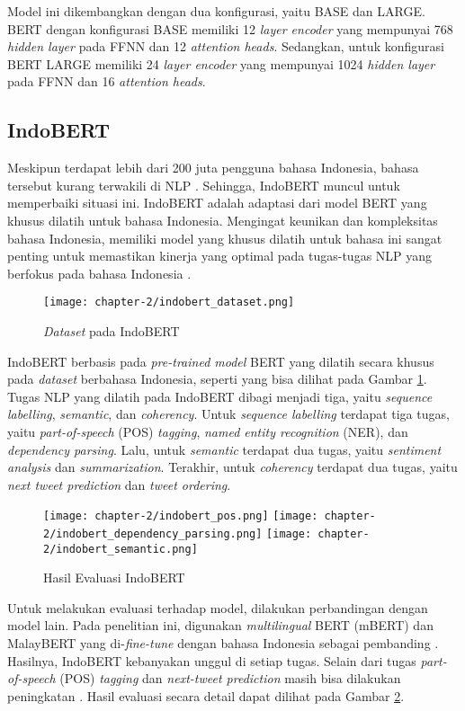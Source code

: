Model ini dikembangkan dengan dua konfigurasi, yaitu BASE dan LARGE. BERT dengan konfigurasi BASE memiliki 12 \textit{layer encoder} yang mempunyai 768 \textit{hidden layer} pada FFNN dan 12 \textit{attention heads}. Sedangkan, untuk konfigurasi BERT LARGE memiliki 24 \textit{layer encoder} yang mempunyai 1024 \textit{hidden layer} pada FFNN dan 16 \textit{attention heads}.

\subsection{IndoBERT}
\label{sec:indobet}

Meskipun terdapat lebih dari 200 juta pengguna bahasa Indonesia, bahasa tersebut kurang terwakili di NLP \parencite{indolem}. Sehingga, IndoBERT muncul untuk memperbaiki situasi ini. IndoBERT adalah adaptasi dari model BERT yang khusus dilatih untuk bahasa Indonesia. Mengingat keunikan dan kompleksitas bahasa Indonesia, memiliki model yang khusus dilatih untuk bahasa ini sangat penting untuk memastikan kinerja yang optimal pada tugas-tugas NLP yang berfokus pada bahasa Indonesia \parencite{indolem}.

\begin{figure}[ht]
    \centering
    \texttt{[image: chapter-2/indobert\_dataset.png]}
    \caption{\textit{Dataset} pada IndoBERT \parencite{indolem}}
    \label{fig:indobert_dataset}
\end{figure}

IndoBERT berbasis pada \textit{pre-trained model} BERT yang dilatih secara khusus pada \textit{dataset} berbahasa Indonesia, seperti yang bisa dilihat pada Gambar \ref{fig:indobert_dataset}. Tugas NLP yang dilatih pada IndoBERT dibagi menjadi tiga, yaitu \textit{sequence labelling}, \textit{semantic}, dan \textit{coherency}. Untuk \textit{sequence labelling} terdapat tiga tugas, yaitu \textit{part-of-speech} (POS) \textit{tagging}, \textit{named entity recognition} (NER), dan \textit{dependency parsing}. Lalu, untuk \textit{semantic} terdapat dua tugas, yaitu \textit{sentiment analysis} dan \textit{summarization}. Terakhir, untuk \textit{coherency} terdapat dua tugas, yaitu \textit{next tweet prediction} dan \textit{tweet ordering}.

\begin{figure}[ht]
    \centering
    \texttt{[image: chapter-2/indobert\_pos.png]}
    \texttt{[image: chapter-2/indobert\_dependency\_parsing.png]}
    \texttt{[image: chapter-2/indobert\_semantic.png]}
    \caption{Hasil Evaluasi IndoBERT \parencite{indolem}}
    \label{fig:indobert_evaluation}
\end{figure}

Untuk melakukan evaluasi terhadap model, dilakukan perbandingan dengan model lain. Pada penelitian ini, digunakan \textit{multilingual} BERT (mBERT) dan MalayBERT yang di-\textit{fine-tune} dengan bahasa Indonesia sebagai pembanding \parencite{indolem}. Hasilnya, IndoBERT kebanyakan unggul di setiap tugas. Selain dari tugas \textit{part-of-speech} (POS) \textit{tagging} dan \textit{next-tweet prediction} masih bisa dilakukan peningkatan \parencite{indolem}. Hasil evaluasi secara detail dapat dilihat pada Gambar \ref{fig:indobert_evaluation}.
